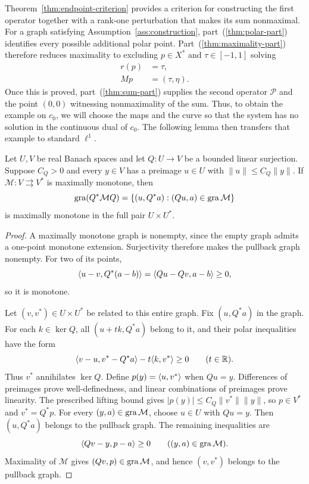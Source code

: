 Theorem~\ref{thm:endpoint-criterion} provides a criterion for constructing
the first operator together with a rank-one perturbation that makes its
sum nonmaximal. For a graph satisfying Assumption~\ref{ass:construction}, part~\textup{(\ref{thm:polar-part})}
identifies every possible additional polar point. Part~\textup{(\ref{thm:maximality-part})} therefore
reduces maximality to excluding $p\in X^*$ and $\tau\in[-1,1]$ solving
\[
\begin{aligned}
r(p)&=\tau,\\
Mp&=(\tau,\eta).
\end{aligned}
\]
Once this is proved, part~\textup{(\ref{thm:sum-part})} supplies the second
operator $\mathcal P$ and the point $(0,0)$ witnessing nonmaximality
of the sum. Thus, to obtain the example on $c_0$, we will choose
the maps and the curve so that the system has no solution in
the continuous dual of $c_0$. The following lemma then transfers that example
to standard $\ell^1$.

\begin{lemma}
\label{lem:surjection-transport}
Let $U,V$ be real Banach spaces and let $Q:U\to V$ be a bounded
linear surjection. Suppose $C_Q>0$ and every $y\in V$ has a preimage
$u\in U$ with $\|u\|\le C_Q\|y\|$. If
$\mathcal M:V\rightrightarrows V^*$ is maximally monotone, then
\[
\operatorname{gra}(Q^*\mathcal M Q)
=\{(u,Q^*a):(Qu,a)\in\operatorname{gra}\mathcal M\}
\]
is maximally monotone in the full pair $U\times U^*$.
\end{lemma}
\begin{proof}
A maximally monotone graph is nonempty, since the empty graph admits
a one-point monotone extension. Surjectivity therefore makes the
pullback graph nonempty. For two of its points,
\[
\langle u-v,Q^*(a-b)\rangle=\langle Qu-Qv,a-b\rangle\ge0,
\]
so it is monotone.

Let $(v,v^*)\in U\times U^*$ be related to this entire graph. Fix
$(u,Q^*a)$ in the graph. For each $k\in\ker Q$, all $(u+t k,Q^*a)$ belong to it,
and their polar inequalities have the form
\[
\langle v-u,v^*-Q^*a\rangle-t\langle k,v^*\rangle\ge0
\qquad(t\in\mathbb R).
\]
Thus $v^*$ annihilates $\ker Q$. Define $p(y)=\langle u,v^*\rangle$ when
$Qu=y$. Differences of preimages prove well-definedness, and linear
combinations of preimages prove linearity. The prescribed lifting bound
gives $|p(y)|\le C_Q\|v^*\|\|y\|$, so $p\in V^*$ and $v^*=Q^*p$.
For every $(y,a)\in\operatorname{gra}\mathcal M$, choose $u\in U$ with $Qu=y$.
Then $(u,Q^*a)$ belongs to the pullback graph. The remaining
inequalities are
\[
\langle Qv-y,p-a\rangle\ge0\qquad((y,a)\in\operatorname{gra}\mathcal M).
\]
Maximality of $\mathcal M$ gives $(Qv,p)\in\operatorname{gra}\mathcal M$, and hence
$(v,v^*)$ belongs to the pullback graph.
\end{proof}

